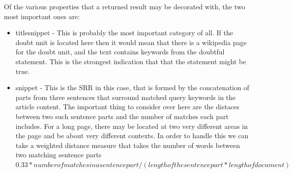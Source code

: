 \documentclass[11pt]{article}
\begin{document}
Of the various properties that a returned result may be decorated with, the two most important ones are:
\begin{itemize}
\item titlesnippet - This is probably the most important category of all. If the doubt unit is located here then it would mean that there is a wikipedia page for the doubt unit, and the text contains keywords from the doubtful statement. This is the strongest indication that that the statement might be true.
\item snippet - This is the SRR in this case, that is formed by the concatenation of parts from three sentences that surround matched query keywords in the article content. The important thing to consider over here are the distaces between two such sentence parts and the number of matches each part includes. For a long page, there may be located at two very different areas in the page and be about very different contexts. In order to handle this we can take a weighted distance measure that takes the number of words between two matching sentence parts $0.33*number of matches in a sentence part/(length of the sentence part*length of document)$

\end{itemize}
\end{document}
